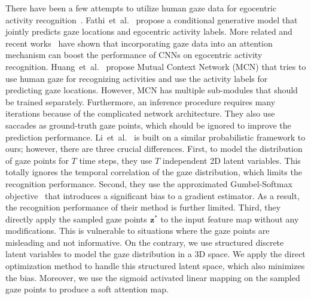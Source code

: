\documentclass[10pt,twocolumn,letterpaper]{article}
\newcommand{\varz}{\mathbf{\mspace{1mu}z}}
\begin{document}
There have been a few attempts to utilize human gaze data for egocentric activity recognition~\cite{fathi2012learning,huang2019mutual,li2018eye}. Fathi~et~al.~\cite{fathi2012learning} propose a conditional generative model that jointly predicts gaze locations and egocentric activity labels. More related and recent works~\cite{huang2019mutual,li2018eye} have shown that incorporating gaze data into an attention mechanism can boost the performance of CNNs on egocentric activity recognition. Huang~et~al.~\cite{huang2019mutual} propose Mutual Context Network (MCN) that tries to use human gaze for recognizing activities and use the activity labels for predicting gaze locations. However, MCN has multiple sub-modules that should be trained separately. Furthermore, an inference procedure requires many iterations because of the complicated network architecture. They also use saccades as ground-truth gaze points, which should be ignored to improve the prediction performance. Li~et~al.~\cite{li2018eye} is built on a similar probabilistic framework to ours; however, there are three crucial differences. First, to model the distribution of gaze points for $T$ time steps, they use $T$ independent 2D latent variables. This totally ignores the temporal correlation of the gaze distribution, which limits the recognition performance. Second, they use the approximated Gumbel-Softmax objective~\cite{jang2016categorical,maddison2016concrete} that introduces a significant bias to a gradient estimator. As a result, the recognition performance of their method is further limited. Third, they directly apply the sampled gaze points $\varz^*$ to the input feature map without any modifications. This is vulnerable to situations where the gaze points are misleading and not informative. On the contrary, we use structured discrete latent variables to model the gaze distribution in a 3D space. We apply the direct optimization method to handle this structured latent space, which also minimizes the bias. Moreover, we use the sigmoid activated linear mapping on the sampled gaze points to produce a soft attention map.
\end{document}
